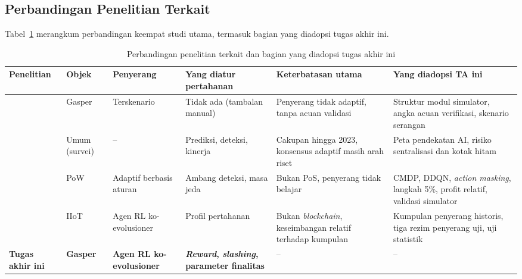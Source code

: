 \subsection{Perbandingan Penelitian Terkait}
Tabel~\ref{tab:perbandingan_literatur} merangkum perbandingan keempat studi utama, termasuk bagian yang diadopsi tugas akhir ini.

\begin{table}[htbp]
\centering
\caption{Perbandingan penelitian terkait dan bagian yang diadopsi tugas akhir ini}
\label{tab:perbandingan_literatur}
\footnotesize
\begin{tabular}{|p{2.2cm}|p{1.4cm}|p{1.9cm}|p{2.1cm}|p{2.9cm}|p{3.1cm}|}
\hline
\textbf{Penelitian} & \textbf{Objek} & \textbf{Penyerang} & \textbf{Yang diatur pertahanan} & \textbf{Keterbatasan utama} & \textbf{Yang diadopsi TA ini} \\
\hline
\textcite{laneve2025stochastic} & Gasper & Terskenario & Tidak ada (tambalan manual) & Penyerang tidak adaptif, tanpa acuan validasi & Struktur modul simulator, angka acuan verifikasi, skenario serangan \\
\hline
\textcite{rizal2025enhancing} & Umum (survei) & -- & Prediksi, deteksi, kinerja & Cakupan hingga 2023, konsensus adaptif masih arah riset & Peta pendekatan AI, risiko sentralisasi dan kotak hitam \\
\hline
\textcite{skowronski2026adaptive} & PoW & Adaptif berbasis aturan & Ambang deteksi, masa jeda & Bukan PoS, penyerang tidak belajar & CMDP, DDQN, \textit{action masking}, langkah 5\%, profit relatif, validasi simulator \\
\hline
\textcite{wushishi2026coadam} & IIoT & Agen RL ko-evolusioner & Profil pertahanan & Bukan \textit{blockchain}, keseimbangan relatif terhadap kumpulan & Kumpulan penyerang historis, tiga rezim penyerang uji, uji statistik \\
\hline
\textbf{Tugas akhir ini} & \textbf{Gasper} & \textbf{Agen RL ko-evolusioner} & \textbf{\textit{Reward}, \textit{slashing}, parameter finalitas} & -- & -- \\
\hline
\end{tabular}
\end{table}

